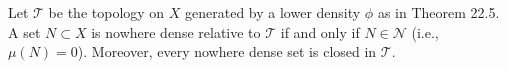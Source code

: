 Let $\mathcal{T}$ be the topology on $X$ generated by a lower density $\phi$ as in Theorem 22.5. A set $N \subset X$ is nowhere dense relative to $\mathcal{T}$ if and only if $N \in \mathcal{N}$ (i.e., $\mu(N) = 0$). Moreover, every nowhere dense set is closed in $\mathcal{T}$.
